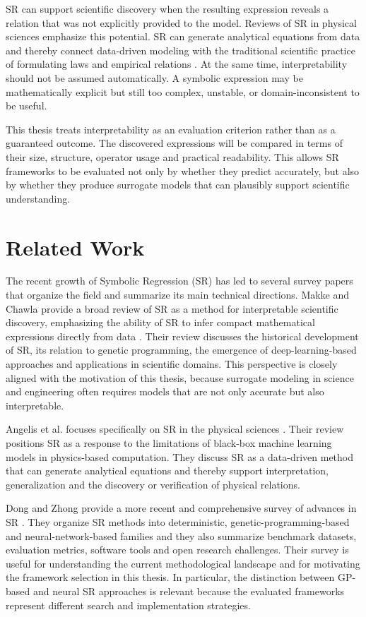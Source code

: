 \documentclass[12pt,oneside,bibtotoc,liststotoc]{scrbook}
\begin{document}
SR can support scientific discovery when the resulting expression reveals a relation that was not explicitly provided to the model. Reviews of SR in physical sciences emphasize this potential. SR can generate analytical equations from data and thereby connect data-driven modeling with the traditional scientific practice of formulating laws and empirical relations \cite{angelis2023artificial,makke2024interpretable}. At the same time, interpretability should not be assumed automatically. A symbolic expression may be mathematically explicit but still too complex, unstable, or domain-inconsistent to be useful.

This thesis treats interpretability as an evaluation criterion rather than as a guaranteed outcome. The discovered expressions will be compared in terms of their size, structure, operator usage and practical readability. This allows SR frameworks to be evaluated not only by whether they predict accurately, but also by whether they produce surrogate models that can plausibly support scientific understanding.


\chapter{Related Work}

The recent growth of Symbolic Regression (SR) has led to several survey papers that organize the field and summarize its main technical directions. Makke and Chawla provide a broad review of SR as a method for interpretable scientific discovery, emphasizing the ability of SR to infer compact mathematical expressions directly from data \cite{makke2024interpretable}. Their review discusses the historical development of SR, its relation to genetic programming, the emergence of deep-learning-based approaches and applications in scientific domains. This perspective is closely aligned with the motivation of this thesis, because surrogate modeling in science and engineering often requires models that are not only accurate but also interpretable.

Angelis et al. focuses specifically on SR in the physical sciences \cite{angelis2023artificial}. Their review positions SR as a response to the limitations of black-box machine learning models in physics-based computation. They discuss SR as a data-driven method that can generate analytical equations and thereby support interpretation, generalization and the discovery or verification of physical relations.

Dong and Zhong provide a more recent and comprehensive survey of advances in SR \cite{dong2025recent}. They organize SR methods into deterministic, genetic-programming-based and neural-network-based families and they also summarize benchmark datasets, evaluation metrics, software tools and open research challenges. Their survey is useful for understanding the current methodological landscape and for motivating the framework selection in this thesis. In particular, the distinction between GP-based and neural SR approaches is relevant because the evaluated frameworks represent different search and implementation strategies.
\end{document}
